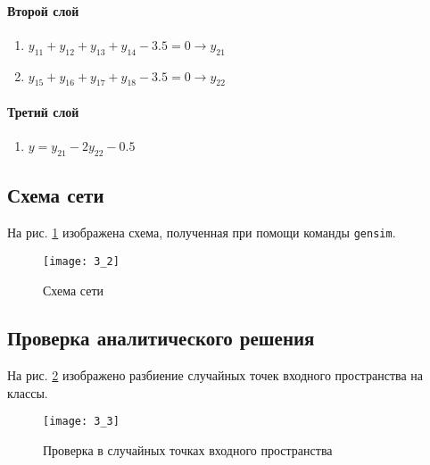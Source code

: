 \paragraph{Второй слой}
\begin{enumerate}
	\item $y_{11} + y_{12} + y_{13} + y_{14} - 3.5 = 0 \rightarrow y_{21}$
	\item $y_{15} + y_{16} + y_{17} + y_{18} - 3.5 = 0 \rightarrow y_{22}$
\end{enumerate}

\paragraph{Третий слой}
\begin{enumerate}
	\item $y = y_{21} - 2 y_{22} - 0.5$
\end{enumerate}

\subsection{Схема сети}


На рис. \ref{fig:3_2} изображена схема, полученная при помощи команды \verb+gensim+.

\begin{figure}[H]
\begin{center}
	\texttt{[image: 3\_2]}
	\caption{Схема сети}
	\label{fig:3_2}
\end{center}
\end{figure}

\subsection{Проверка аналитического решения}


На рис. \ref{fig:3_3} изображено разбиение случайных точек входного пространства на классы.

\begin{figure}[H]
\begin{center}
	\texttt{[image: 3\_3]}
	\caption{Проверка в случайных точках входного пространства}
	\label{fig:3_3}
\end{center}
\end{figure}

